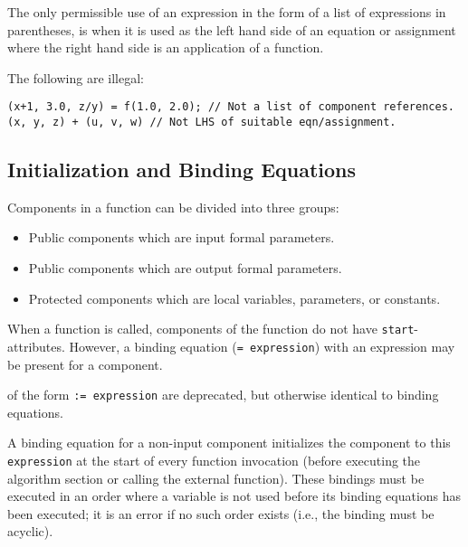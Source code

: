 The only permissible use of an expression in the form of a list of
expressions in parentheses, is when it is used as the left hand side of
an equation or assignment where the right hand side is an application of
a function.

\begin{example}
The following are illegal:
\begin{lstlisting}[language=modelica]
(x+1, 3.0, z/y) = f(1.0, 2.0); // Not a list of component references.
(x, y, z) + (u, v, w) // Not LHS of suitable eqn/assignment.
\end{lstlisting}
\end{example}

\subsection{Initialization and Binding Equations}%
\label{initialization-and-binding-equations-of-components-in-functions}%
\label{initialization-and-declaration-assignments-of-components-in-functions}

Components in a function can be divided into three groups:
\begin{itemize}
\item
  Public components which are input formal parameters.
\item
  Public components which are output formal parameters.
\item
  Protected components which are local variables, parameters, or
  constants.
\end{itemize}

When a function is called, components of the function do not have \lstinline!start!-attributes.
However, a binding equation (\lstinline!= expression!) with an expression may be present for a component.
\begin{nonnormative}
 of the form \lstinline!:= expression! are deprecated, but otherwise identical to binding equations.
\end{nonnormative}

A binding equation for a non-input component initializes the
component to this \lstinline!expression! at the start of every function invocation
(before executing the algorithm section or calling the external
function). These bindings must be executed in an order where a variable
is not used before its binding equations has been executed; it is
an error if no such order exists (i.e., the binding must be acyclic).

